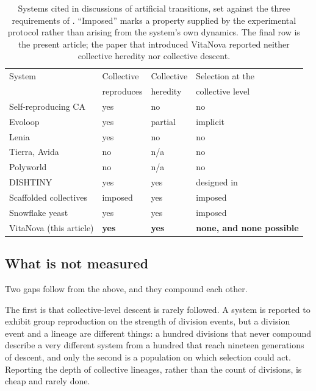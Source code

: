 \documentclass{artificial-life}
\begin{document}
\begin{table}[tp]
\centering
\small
\begin{tabular}{llll}
\hline
System & Collective & Collective & Selection at the \\
       & reproduces & heredity & collective level \\
\hline
Self-reproducing CA \citep{langton1984self} & yes & no & no \\
Evoloop \citep{sayama1999evoloop} & yes & partial & implicit \\
Lenia \citep{chan2020lenia} & yes & no & no \\
Tierra, Avida \citep{ray1991approach,ofria2004avida} & no & n/a & no \\
Polyworld \citep{yaeger1994polyworld} & no & n/a & no \\
DISHTINY \citep{moreno2019dishtiny} & yes & yes & designed in \\
Scaffolded collectives \citep{black2020scaffolding} & imposed & yes & imposed \\
Snowflake yeast \citep{ratcliff2012experimental} & yes & yes & imposed \\
VitaNova (this article) & \textbf{yes} & \textbf{yes} & \textbf{none, and none possible} \\
\hline
\end{tabular}
\caption{Systems cited in discussions of artificial transitions, set against the
three requirements of \citet{godfreysmith2009}. ``Imposed'' marks a property
supplied by the experimental protocol rather than arising from the system's own
dynamics. The final row is the present article; the paper that introduced
VitaNova \citep{le2025vitanova} reported neither collective heredity nor
collective descent.}
\label{tab:systems}
\end{table}

\subsection{What is not measured}

Two gaps follow from the above, and they compound each other.

The first is that collective-level descent is rarely followed. A system is
reported to exhibit group reproduction on the strength of division events, but a
division event and a lineage are different things: a hundred divisions that
never compound describe a very different system from a hundred that reach
nineteen generations of descent, and only the second is a population on which
selection could act. Reporting the depth of collective lineages, rather than the
count of divisions, is cheap and rarely done.
\end{document}
